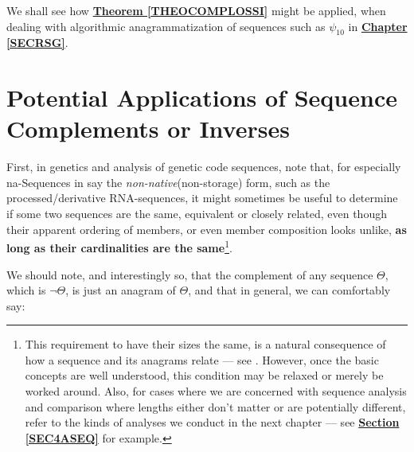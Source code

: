 \documentclass[a4paper, 18pt]{book} %
\begin{document}
We shall see how \textbf{\hyperref[THEOCOMPLOSSI]{Theorem  \ref{THEOCOMPLOSSI}}} might be applied, when dealing with algorithmic anagrammatization of sequences such as $\psi_{10}$ in \textbf{\hyperref[SECRSG]{Chapter \ref{SECRSG}}}.


\section{Potential Applications of Sequence Complements or Inverses}
\label{SECAPPCOMPLEMENTS}


First, in genetics and analysis of genetic code sequences, note that, for especially na-Sequences in say the \textit{non-native}(non-storage) form, such as the processed/derivative RNA-sequences, it might sometimes be useful to determine if some two sequences are the same, equivalent or closely related, even though their apparent ordering of members, or even member composition looks unlike, \textbf{as long as their cardinalities are the same}\footnote{This requirement to have their sizes the same, is a natural consequence of how a sequence and its anagrams relate --- see \cite{adtpaper}. However, once the basic concepts are well understood, this condition may be relaxed or merely be worked around. Also, for cases where we are concerned with sequence analysis and comparison where lengths either don't matter or are potentially different, refer to the kinds of analyses we conduct in the next chapter --- see \textbf{\hyperref[SEC4ASEQ]{Section \ref{SEC4ASEQ}}} for example.}.

We should note, and interestingly so, that the complement of any sequence $\Theta$, which is $\lnot\Theta$, is just an anagram of $\Theta$, and that in general, we can comfortably say:

\vspace{2em}
\end{document}
